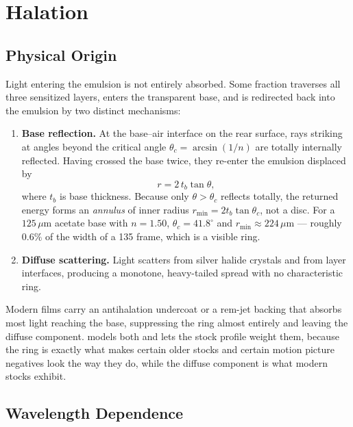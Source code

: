 \section{Halation}
\label{sec:halation}

\subsection{Physical Origin}

Light entering the emulsion is not entirely absorbed. Some fraction traverses
all three sensitized layers, enters the transparent base, and is redirected back
into the emulsion by two distinct mechanisms:

\begin{enumerate}
\item \textbf{Base reflection.} At the base--air interface on the rear surface,
rays striking at angles beyond the critical angle
$\theta_c = \arcsin(1/n)$ are totally internally reflected. Having crossed the
base twice, they re-enter the emulsion displaced by
\begin{equation}
r = 2\, t_b \tan\theta,
\label{eq:ringradius}
\end{equation}
where $t_b$ is base thickness. Because only $\theta > \theta_c$ reflects
totally, the returned energy forms an \emph{annulus} of inner radius
$r_{\min} = 2 t_b \tan\theta_c$, not a disc. For a $125\,\mu$m acetate base with
$n = 1.50$, $\theta_c = 41.8^\circ$ and $r_{\min} \approx 224\,\mu$m --- roughly
$0.6\%$ of the width of a 135 frame, which is a visible ring.
\item \textbf{Diffuse scattering.} Light scatters from silver halide crystals
and from layer interfaces, producing a monotone, heavy-tailed spread with no
characteristic ring.
\end{enumerate}

Modern films carry an antihalation undercoat or a rem-jet backing that absorbs
most light reaching the base, suppressing the ring almost entirely and leaving
the diffuse component. \EM{} models both and lets the stock profile weight
them, because the ring is exactly what makes certain older stocks and certain
motion picture negatives look the way they do, while the diffuse component is
what modern stocks exhibit.

\subsection{Wavelength Dependence}

